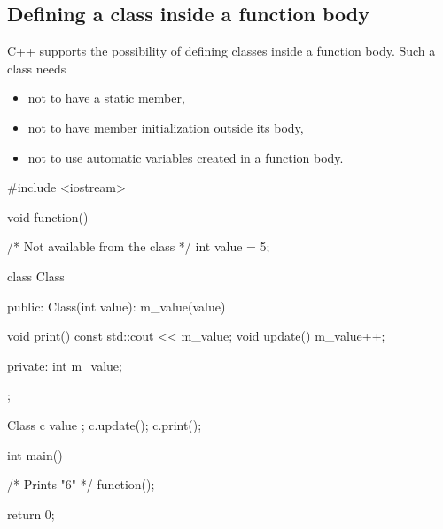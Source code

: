\documentclass[../main]{subfiles}
\begin{document}
\subsection{Defining a class inside a function body}
    C++ supports the possibility of defining classes inside a function body. Such a class needs
\begin{itemize}
    \item not to have a static member,
    \item not to have member initialization outside its body,
    \item not to use automatic variables created in a function body.
\end{itemize}

\begin{Code}
    #include <iostream>
    
    void function()
    {
        /* Not available from the class */
        int value = 5;
        
        class Class
        {
            public:
                Class(int value): m_value(value) {}
                
                void print() const { std::cout << m_value; }
                void update() { m_value++; }
              
            private:
                int m_value;
        };
        
        Class c { value };
        c.update();
        c.print();
    }
    
    int main()
    {
        /* Prints "6" */
        function();
        
        return 0;
    }
\end{Code}
\end{document}
